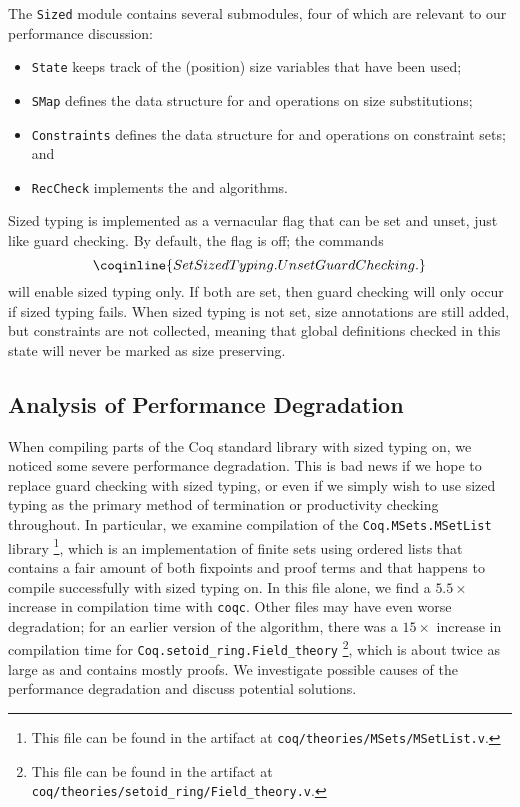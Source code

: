 The \texttt{Sized} module contains several submodules, four of which are relevant to our performance discussion:
\begin{itemize}
  \item \texttt{State} keeps track of the (position) size variables that have been used;
  \item \texttt{SMap} defines the data structure for and operations on size substitutions;
  \item \texttt{Constraints} defines the data structure for and operations on constraint sets; and
  \item \texttt{RecCheck} implements the \RecCheck and \solve algorithms.
\end{itemize}

Sized typing is implemented as a vernacular flag that can be set and unset, just like guard checking.
By default, the flag is off; the commands
$$\coqinline{Set Sized Typing. Unset Guard Checking.}$$
will enable sized typing only.
If both are set, then guard checking will only occur if sized typing fails.
When sized typing is not set, size annotations are still added, but constraints are not collected,
meaning that global definitions checked in this state will never be marked as size preserving.

\subsection{Analysis of Performance Degradation}

When compiling parts of the Coq standard library with sized typing on, we noticed some severe performance degradation.
This is bad news if we hope to replace guard checking with sized typing,
or even if we simply wish to use sized typing as the primary method of termination or productivity checking throughout.
In particular, we examine compilation of the \texttt{Coq.MSets.MSetList} library%
\footnote{This file can be found in the artifact at \texttt{coq/theories/MSets/MSetList.v}.},
which is an implementation of finite sets using ordered lists
that contains a fair amount of both fixpoints and proof terms
and that happens to compile successfully with sized typing on.
In this file alone, we find a $5.5\times$ increase in compilation time with \texttt{coqc}.
Other files may have even worse degradation; for an earlier version of the algorithm,
there was a $15\times$ increase in compilation time for \texttt{Coq.setoid\_ring.Field\_theory}%
\footnote{This file can be found in the artifact at \texttt{coq/theories/setoid\_ring/Field\_theory.v}.},
which is about twice as large as \msetlist and contains mostly proofs.
We investigate possible causes of the performance degradation and discuss potential solutions.

